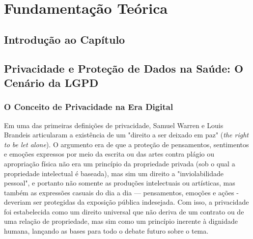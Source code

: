 
\chapter{Fundamentação Teórica}
\label{ch:fundamentacao-teorica}

\section{Introdução ao Capítulo}
\label{sec:fund-intro}

\section{Privacidade e Proteção de Dados na Saúde: O Cenário da LGPD}
\label{sec:fund-lgpd}

\subsection{O Conceito de Privacidade na Era Digital}
\label{subsec:fund-privacidade}
Em uma das primeiras definições de privacidade, Samuel Warren e Louis Brandeis \cite{WarrenBrandeis1890} articularam a existência de um "direito a ser deixado em paz" (\textit{the right to be let alone}). O argumento era de que a proteção de pensamentos, sentimentos e emoções expressos por meio da escrita ou das artes contra plágio ou apropriação física não era um princípio da propriedade privada (sob o qual a propriedade intelectual é baseada), mas sim um direito a "inviolabilidade pessoal", e portanto não somente  as produções intelectuais ou artísticas, mas também as expressões casuais do dia a dia — pensamentos, emoções e ações - deveriam ser protegidas da exposição pública indesejada. Com isso, a privacidade foi estabelecida como um direito universal que não deriva de um contrato ou de uma relação de propriedade, mas sim como um princípio inerente à dignidade humana, lançando as bases para todo o debate futuro sobre o tema.

